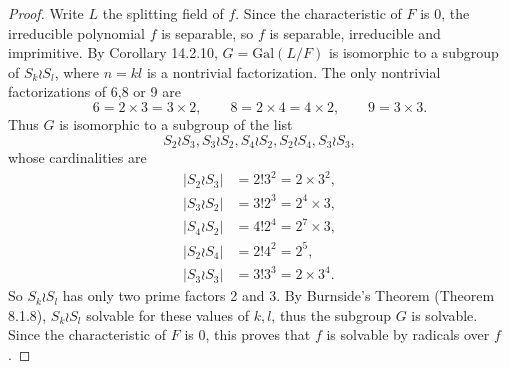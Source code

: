 \documentclass[11pt,a4paper]{article}
\newcommand{\Gal}{\mathrm{Gal}}
\begin{document}
\begin{proof}
Write $L$ the splitting field of $f$. Since the characteristic of $F$ is 0, the irreducible polynomial $f$ is separable, so $f$ is separable, irreducible and imprimitive.  By Corollary 14.2.10, $G = \Gal(L/F)$ is isomorphic to a subgroup of $S_k \wr S_l$, where $n = kl$ is a nontrivial factorization. The only nontrivial factorizations of 6,8 or 9 are
$$6 = 2 \times 3 = 3 \times 2, \qquad 8 = 2 \times 4 = 4 \times 2, \qquad 9 = 3 \times 3.$$
Thus $G$ is isomorphic to a subgroup of the list
$$S_2 \wr S_3, S_3\wr S_2,S_4 \wr S_2,S_2 \wr S_4, S_3\wr S_3,$$
whose cardinalities are
\begin{align*}
|S_2 \wr S_3| &= 2!3^2 = 2 \times 3^2,\\
 |S_3\wr S_2| &= 3!2^3 = 2^4 \times 3,\\
 |S_4 \wr S_2| &= 4!2^4 = 2^7 \times 3,\\
 |S_2 \wr S_4| &= 2!4^2 = 2^5,\\
 |S_3\wr S_3| &=3!3^3 = 2 \times 3^4. 
\end{align*}
So $S_k \wr S_l$ has only two prime factors 2 and 3. By Burnside's Theorem (Theorem 8.1.8), $S_k \wr S_l$ solvable for these values of $k,l$, thus the subgroup $G$ is solvable. Since the characteristic of $F$ is 0, this proves that $f$ is solvable by radicals over $f$.
\end{proof}
\end{document}
